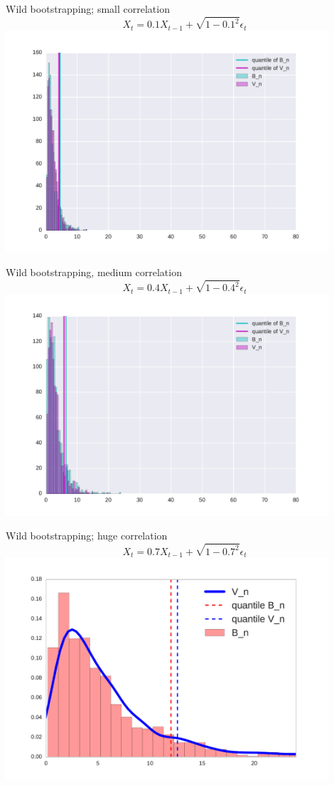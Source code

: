 \documentclass{beamer}
\begin{document}
 \begin{frame}{Wild bootstrapping; small correlation }
\centering
 $$X_t = 0.1 X_{t-1} + \sqrt{1 - 0.1^2}\epsilon_t$$
 \includegraphics[width=0.9\textwidth]{./img/bootstrapWorks1.pdf}

 \end{frame}

 \begin{frame}{Wild bootstrapping, medium correlation}
\centering
 $$X_t = 0.4 X_{t-1} + \sqrt{1 - 0.4^2}\epsilon_t$$
 \includegraphics[width=0.9\textwidth]{./img/bootstrapWorks4.pdf}
\end{frame}

 \begin{frame}{Wild bootstrapping; huge correlation}
\centering
 $$X_t = 0.7 X_{t-1} + \sqrt{1 - 0.7^2}\epsilon_t$$
 \includegraphics[width=0.9\textwidth]{./img/bootstrapWorks7.pdf}
\end{frame}
\end{document}
